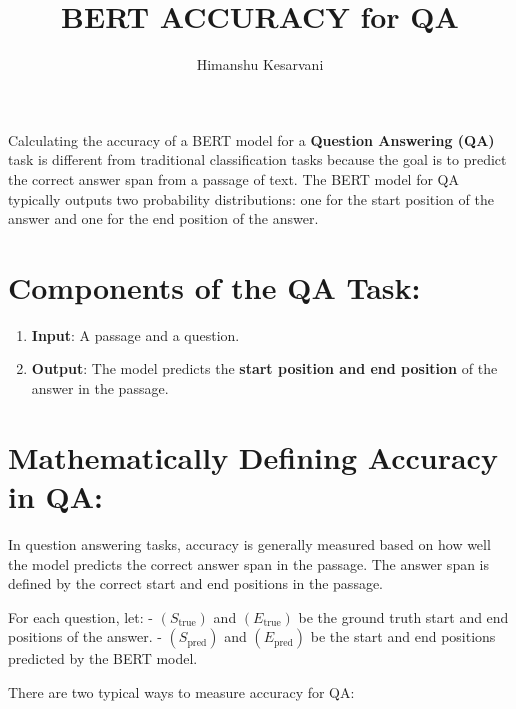 \documentclass[10pt]{article}
\begin{document}
\title{BERT ACCURACY for QA}
\author{Himanshu Kesarvani}
\maketitle

Calculating the accuracy of a BERT model for a {\bf Question Answering (QA)} task is different from traditional classification tasks because the goal is to predict the correct answer span from a passage of text. The BERT model for QA typically outputs two probability distributions: one for the start position of the answer and one for the end position of the answer.

\section*{ Components of the QA Task:}
\begin{enumerate}
   \item {\bf Input}: A passage and a question.
   \item {\bf Output}: The model predicts the { \bf start position{ \bf  and  }end position } of the answer in the passage.
\end{enumerate}

   
\section*{ Mathematically Defining Accuracy in QA:}
In question answering tasks, accuracy is generally measured based on how well the model predicts the correct answer span in the passage. The answer span is defined by the correct start and end positions in the passage.

For each question, let:
- $( S_{\text{true}} )$ and $( E_{\text{true}} )$ be the ground truth start and end positions of the answer.
- $( S_{\text{pred}} )$ and $( E_{\text{pred}} )$ be the start and end positions predicted by the BERT model.

There are two typical ways to measure accuracy for QA:
\end{document}
